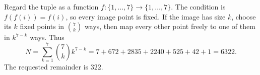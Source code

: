 Regard the tuple as a function $f:\{1,\ldots,7\}\to\{1,\ldots,7\}$. The condition is $f(f(i))=f(i)$, so every image point is fixed. If the image has size $k$, choose its $k$ fixed points in $\binom7k$ ways, then map every other point freely to one of them in $k^{7-k}$ ways. Thus
\[
N=\sum_{k=1}^7\binom7k k^{7-k}
=7+672+2835+2240+525+42+1=6322.
\]
The requested remainder is $\boxed{322}$.
